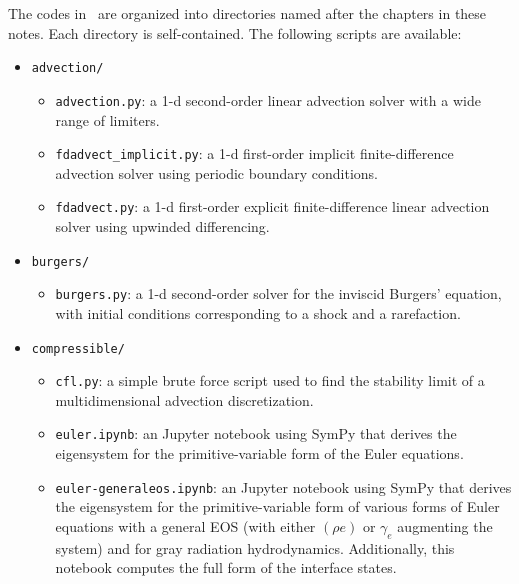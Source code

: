 The codes in \hydroex\ are organized into directories named after the
chapters in these notes.  Each directory is self-contained.  The
following scripts are available:

\begin{itemize}

\item {\tt advection/}

  \begin{itemize}
  \item {\tt advection.py}: a 1-d second-order linear advection solver
    with a wide range of limiters.

  \item {\tt fdadvect\_implicit.py}: a 1-d first-order implicit
    finite-difference advection solver using periodic boundary
    conditions.

  \item {\tt fdadvect.py}: a 1-d first-order explicit
    finite-difference linear advection solver using upwinded
    differencing.

  \end{itemize}

\item {\tt burgers/}

  \begin{itemize}
  \item {\tt burgers.py}: a 1-d second-order solver for the inviscid
    Burgers' equation, with initial conditions corresponding to a
    shock and a rarefaction.

  \end{itemize}

\item {\tt compressible/}

  \begin{itemize}
  \item {\tt cfl.py}: a simple brute force script used to find the stability
    limit of a multidimensional advection discretization.

  \item {\tt euler.ipynb}: an {\sf Jupyter} notebook using {\sf SymPy}
      that derives the eigensystem for the primitive-variable form
      of the Euler equations.

  \item {\tt euler-generaleos.ipynb}: an {\sf Jupyter} notebook using
    {\sf SymPy} that derives the eigensystem for the
    primitive-variable form of various forms of Euler equations with a
    general EOS (with either $(\rho e)$ or $\gamma_e$ augmenting the
    system) and for gray radiation hydrodynamics.  Additionally, this
    notebook computes the full form of the interface states.


\end{itemize}
\end{itemize}
